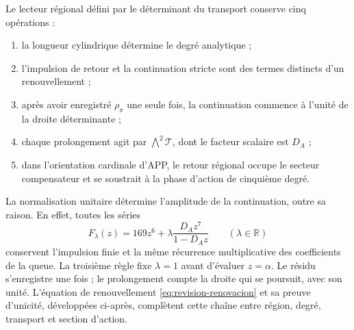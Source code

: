 \begin{definition}
\label{def:accion-lector-regional}
Le lecteur régional défini par le déterminant du transport conserve cinq opérations :
\begin{enumerate}
 \item la longueur cylindrique détermine le degré analytique ;
 \item l’impulsion de retour et la continuation stricte sont des termes
 distincts d’un renouvellement ;
 \item après avoir enregistré \(\rho_\pi\) une seule fois, la continuation
 commence à l’unité de la droite déterminante ;
 \item chaque prolongement agit par \(\bigwedge^2\mathcal T\), dont
 le facteur scalaire est \(D_A\) ;
 \item dans l’orientation cardinale d’APP, le retour régional occupe le
 secteur compensateur et se soustrait à la phase d’action de cinquième degré.
\end{enumerate}
\end{definition}

La normalisation unitaire détermine l’amplitude de la continuation, outre
sa raison. En effet, toutes les séries
\[
 F_\lambda(z)=169z^6+\lambda\frac{D_Az^7}{1-D_Az}
 \qquad(\lambda\in\mathbb R)
\]
conservent l’impulsion finie et la même récurrence multiplicative des
coefficients de la queue. La troisième règle fixe \(\lambda=1\) avant d’évaluer
\(z=\alpha\). Le résidu s’enregistre une fois ; le prolongement compte
la droite qui se poursuit, avec son unité. L’équation de renouvellement
\eqref{eq:revision-renovacion} et sa preuve d’unicité, développées
ci-après, complètent cette chaîne entre région, degré,
transport et section d’action.
